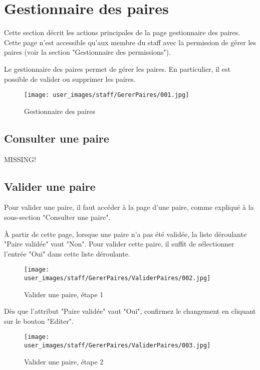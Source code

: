 \section{Gestionnaire des paires}

Cette section décrit les actions principales de la page gestionnaire des paires. Cette page n'est accessible qu'aux membre du staff avec la permission de gérer les paires (voir la section "Gestionnaire des permissions").\newline

Le gestionnaire des paires permet de gérer les paires. En particulier, il est possible de valider ou supprimer les paires.

\begin{figure}[H]
\centering
\texttt{[image: user\_images/staff/GererPaires/001.jpg]}
\caption{Gestionnaire des paires}
\end{figure}

\subsection{Consulter une paire}

MISSING!

\subsection{Valider une paire}

Pour valider une paire, il faut accéder à la page d'une paire, comme expliqué à la sous-section "Consulter une paire".\newline

À partir de cette page, lorsque une paire n'a pas été validée, la liste déroulante "Paire validée" vaut "Non". Pour valider cette paire, il suffit de sélectionner l'entrée "Oui" dans cette liste déroulante.

\begin{figure}[H]
\centering
\texttt{[image: user\_images/staff/GererPaires/ValiderPaires/002.jpg]}
\caption{Valider une paire, étape 1}
\end{figure}

Dès que l'attribut "Paire validée" vaut "Oui", confirmez le changement en cliquant sur le bouton "Editer".

\begin{figure}[H]
\centering
\texttt{[image: user\_images/staff/GererPaires/ValiderPaires/003.jpg]}
\caption{Valider une paire, étape 2}
\end{figure}

